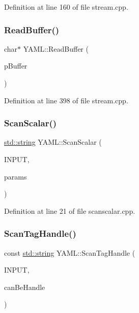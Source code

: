 Definition at line 160 of file stream.\+cpp.

\mbox{\label{namespace_y_a_m_l_adb74728c1e3294063a8421807c083b16}} 
\subsubsection{\texorpdfstring{ReadBuffer()}{ReadBuffer()}}
{\footnotesize\ttfamily char$\ast$ Y\+A\+M\+L\+::\+Read\+Buffer (\begin{DoxyParamCaption}\item[{unsigned char $\ast$}]{p\+Buffer }\end{DoxyParamCaption})\hspace{0.3cm}{\ttfamily [inline]}}



Definition at line 398 of file stream.\+cpp.

\mbox{\label{namespace_y_a_m_l_a7379ec57fc0e2d7647f1dd7a0dc7ba1e}} 
\subsubsection{\texorpdfstring{ScanScalar()}{ScanScalar()}}
{\footnotesize\ttfamily \mbox{\hyperlink{glad_8h_ac83513893df92266f79a515488701770}{std\+::string}} Y\+A\+M\+L\+::\+Scan\+Scalar (\begin{DoxyParamCaption}\item[{\mbox{\hyperlink{class_y_a_m_l_1_1_stream}{Stream}} \&}]{I\+N\+P\+UT,  }\item[{\mbox{\hyperlink{struct_y_a_m_l_1_1_scan_scalar_params}{Scan\+Scalar\+Params}} \&}]{params }\end{DoxyParamCaption})}



Definition at line 21 of file scanscalar.\+cpp.

\mbox{\label{namespace_y_a_m_l_a751d0c63168022fe1fba52f919fb843f}} 
\subsubsection{\texorpdfstring{ScanTagHandle()}{ScanTagHandle()}}
{\footnotesize\ttfamily const \mbox{\hyperlink{glad_8h_ac83513893df92266f79a515488701770}{std\+::string}} Y\+A\+M\+L\+::\+Scan\+Tag\+Handle (\begin{DoxyParamCaption}\item[{\mbox{\hyperlink{class_y_a_m_l_1_1_stream}{Stream}} \&}]{I\+N\+P\+UT,  }\item[{bool \&}]{can\+Be\+Handle }\end{DoxyParamCaption})}




